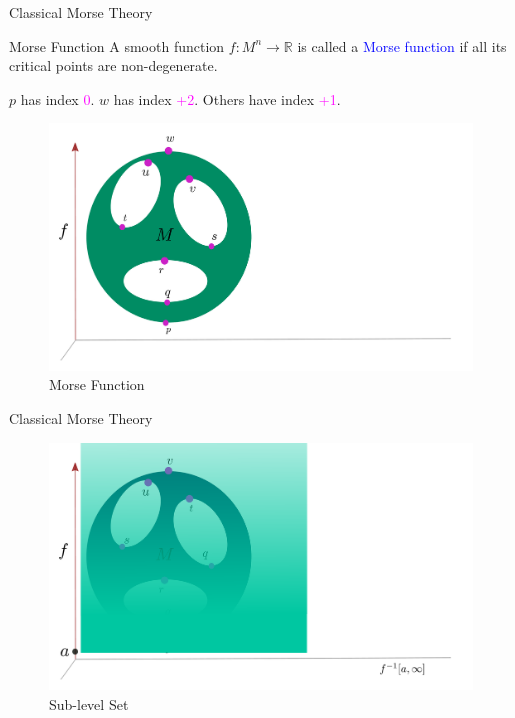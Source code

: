 \documentclass[9pt,sans-serif]{beamer}
\begin{document}
\begin{frame}{Classical Morse Theory}  
  \begin{block}{Morse Function}
    A smooth function $f:M^n\to\mathbb R$ is called a \textcolor{blue}{Morse
      function} if all its critical points are non-degenerate.  \\ \pause

    $p$ has index \textcolor{magenta}{0}. $w$ has index
    \textcolor{magenta}{+2}. Others have index \textcolor{magenta}{+1}.

  \end{block}
  
  
  \begin{figure}
    \centering
    \includegraphics[scale=0.15]{0}
    \caption{Morse Function}
  \end{figure}

\end{frame}


\begin{frame}{Classical Morse Theory}
  \begin{figure}
    \centering
    \includegraphics[scale=0.2]{1}
    \caption{Sub-level Set}
  \end{figure}
\end{frame}
\end{document}
